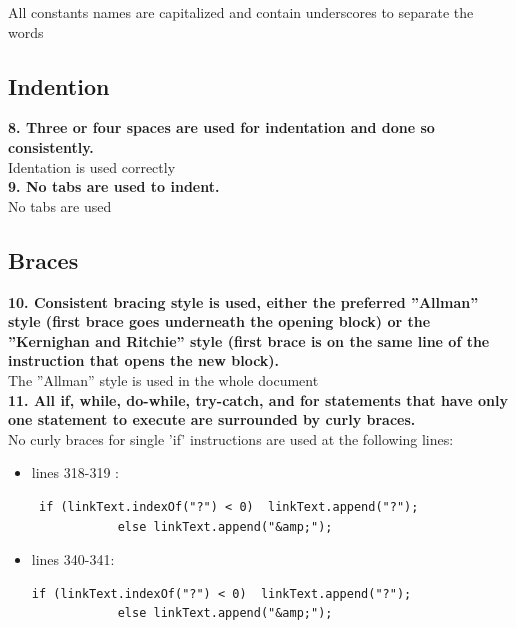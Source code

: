 \documentclass{article}
\begin{document}
\begin{flushleft}
All constants names are capitalized and contain underscores to separate the words  \\
\vspace{0.5cm}




\subsection{Indention}
\textbf{8. Three or four spaces are used for indentation and done so consistently.}\\
\vspace{0.5cm}
Identation is used correctly\\
\vspace{0.5cm}
\textbf{9. No tabs are used to indent.}\\
\vspace{0.5cm}
No tabs are used \\
\vspace{0.5cm}





\subsection{Braces}
\textbf{10. Consistent bracing style is used, either the preferred  ''Allman'' style (first brace goes underneath the opening block) or the ''Kernighan and Ritchie'' style (first brace is on the same line of the instruction that opens the new block).}\\
\vspace{0.5cm}
The ''Allman'' style is used in the whole document\\
\vspace{0.5cm}
\textbf{11. All if, while, do-while, try-catch, and for statements that have only one statement to execute are surrounded by curly braces.}\\
\vspace{0.5cm}
No curly braces for single 'if' instructions are used at the following lines:\\
\vspace{0.5cm}
\begin{itemize}
\item lines 318-319 :\\
\vspace{0.5cm}
\begin{lstlisting}
 if (linkText.indexOf("?") < 0)  linkText.append("?");
            else linkText.append("&amp;");
\end{lstlisting}
\vspace{0.5cm}
\item lines 340-341:\\
\vspace{0.5cm}
\begin{lstlisting}
if (linkText.indexOf("?") < 0)  linkText.append("?");
            else linkText.append("&amp;"); 
  \end{lstlisting}
\end{itemize}
\vspace{0.5cm}





\end{flushleft}
\end{document}
